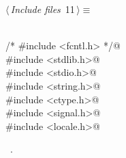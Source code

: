 \documentclass[a4paper]{report}
\begin{document}
\begin{flushleft} \small
\begin{minipage}{\linewidth}\label{scrap2}\raggedright\small
{} $\langle\,${\it Include files}\nobreak\ {\footnotesize {11}}$\,\rangle\equiv$
\vspace{-1ex}
\begin{list}{}{} \item
\mbox{}\verb@@\\
\mbox{}\verb@/* #include <fcntl.h> */@\\
\mbox{}\verb@#include <stdlib.h>@\\
\mbox{}\verb@#include <stdio.h>@\\
\mbox{}\verb@#include <string.h>@\\
\mbox{}\verb@#include <ctype.h>@\\
\mbox{}\verb@#include <signal.h>@\\
\mbox{}\verb@#include <locale.h>@\\
\mbox{}\verb@@{\NWsep}
\end{list}
\vspace{-1.5ex}
\footnotesize
\begin{list}{}{\setlength{\itemsep}{-\parsep}\setlength{\itemindent}{-\leftmargin}}
\item \NWtxtMacroRefIn\ .

\end{list}
\end{minipage}
\end{flushleft}
\end{document}
